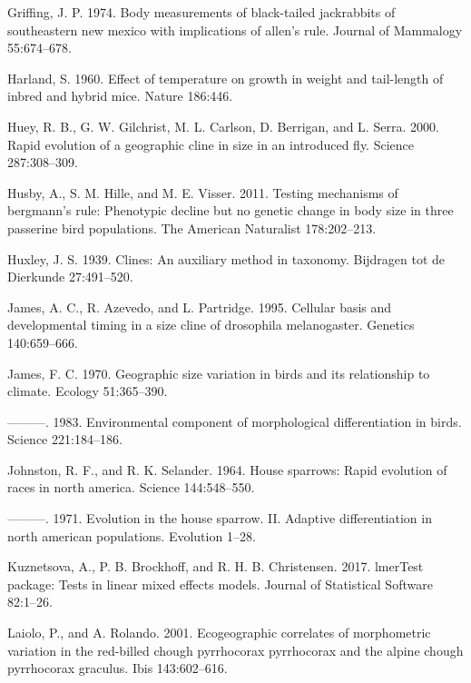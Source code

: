 \documentclass[]{article}
\begin{document}
\leavevmode\hypertarget{ref-Griffing1974}{}%
Griffing, J. P. 1974. Body measurements of black-tailed jackrabbits of
southeastern new mexico with implications of allen's rule. Journal of
Mammalogy 55:674--678.

\leavevmode\hypertarget{ref-Harland1960}{}%
Harland, S. 1960. Effect of temperature on growth in weight and
tail-length of inbred and hybrid mice. Nature 186:446.

\leavevmode\hypertarget{ref-Huey2000}{}%
Huey, R. B., G. W. Gilchrist, M. L. Carlson, D. Berrigan, and L. Serra.
2000. Rapid evolution of a geographic cline in size in an introduced
fly. Science 287:308--309.

\leavevmode\hypertarget{ref-Husby2011}{}%
Husby, A., S. M. Hille, and M. E. Visser. 2011. Testing mechanisms of
bergmann's rule: Phenotypic decline but no genetic change in body size
in three passerine bird populations. The American Naturalist
178:202--213.

\leavevmode\hypertarget{ref-Huxley1939}{}%
Huxley, J. S. 1939. Clines: An auxiliary method in taxonomy. Bijdragen
tot de Dierkunde 27:491--520.

\leavevmode\hypertarget{ref-James1995}{}%
James, A. C., R. Azevedo, and L. Partridge. 1995. Cellular basis and
developmental timing in a size cline of drosophila melanogaster.
Genetics 140:659--666.

\leavevmode\hypertarget{ref-James1970}{}%
James, F. C. 1970. Geographic size variation in birds and its
relationship to climate. Ecology 51:365--390.

\leavevmode\hypertarget{ref-James1983}{}%
---------. 1983. Environmental component of morphological
differentiation in birds. Science 221:184--186.

\leavevmode\hypertarget{ref-Johnston1964}{}%
Johnston, R. F., and R. K. Selander. 1964. House sparrows: Rapid
evolution of races in north america. Science 144:548--550.

\leavevmode\hypertarget{ref-Johnston1971}{}%
---------. 1971. Evolution in the house sparrow. II. Adaptive
differentiation in north american populations. Evolution 1--28.

\leavevmode\hypertarget{ref-Kuznetsova2017}{}%
Kuznetsova, A., P. B. Brockhoff, and R. H. B. Christensen. 2017.
lmerTest package: Tests in linear mixed effects models. Journal of
Statistical Software 82:1--26.

\leavevmode\hypertarget{ref-Laiolo2001}{}%
Laiolo, P., and A. Rolando. 2001. Ecogeographic correlates of
morphometric variation in the red-billed chough pyrrhocorax pyrrhocorax
and the alpine chough pyrrhocorax graculus. Ibis 143:602--616.
\end{document}
